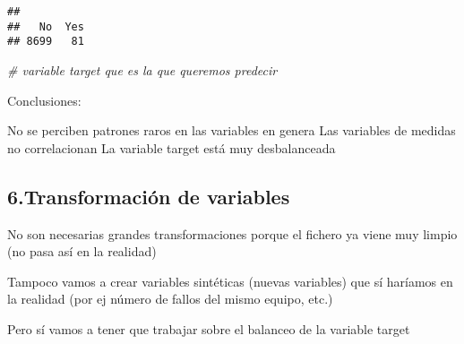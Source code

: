 \documentclass[
]{article}
\newenvironment{Shaded}{\begin{snugshade}}{\end{snugshade}}
\newcommand{\CommentTok}[1]{\textcolor[rgb]{0.56,0.35,0.01}{\textit{#1}}}
\newcommand{\FunctionTok}[1]{\textcolor[rgb]{0.00,0.00,0.00}{#1}}
\newcommand{\NormalTok}[1]{#1}
\newcommand{\SpecialCharTok}[1]{\textcolor[rgb]{0.00,0.00,0.00}{#1}}
\begin{document}
\begin{Shaded}
\end{Shaded}

\begin{verbatim}
## 
##   No  Yes 
## 8699   81
\end{verbatim}

\begin{Shaded}
\begin{Highlighting}[]
\CommentTok{\# variable target que es la que queremos predecir}
\end{Highlighting}
\end{Shaded}

Conclusiones:

No se perciben patrones raros en las variables en genera Las variables
de medidas no correlacionan La variable target está muy desbalanceada

\hypertarget{transformaciuxf3n-de-variables}{%
\subsection{6.Transformación de
variables}\label{transformaciuxf3n-de-variables}}

No son necesarias grandes transformaciones porque el fichero ya viene
muy limpio (no pasa así en la realidad)

Tampoco vamos a crear variables sintéticas (nuevas variables) que sí
haríamos en la realidad (por ej número de fallos del mismo equipo, etc.)

Pero sí vamos a tener que trabajar sobre el balanceo de la variable
target
\end{document}
